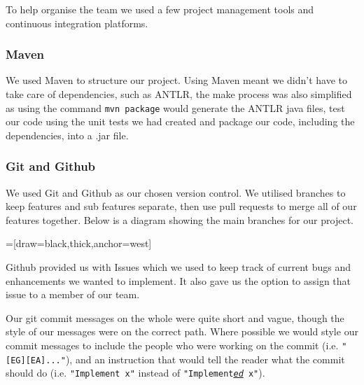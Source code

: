 \documentclass[11pt,a4paper]{article}
\begin{document}
To help organise the team we used a few project management tools and continuous integration platforms.

\subsubsection{Maven}
\label{subs:Maven}

We used Maven to structure our project. Using Maven meant we didn't have to take care of dependencies, such as ANTLR, the make process was also simplified as using the command \texttt{mvn package} would generate the ANTLR java files, test our code using the unit tests we had created and package our code, including the dependencies, into a .jar file.


\subsubsection{Git and Github}
\label{subs:Git and Github}

We used Git and Github as our chosen version control. We utilised branches to keep features and sub features separate, then use pull requests to merge all of our features together. Below is a diagram showing the main branches for our project.

=[draw=black,thick,anchor=west]

Github provided us with Issues which we used to keep track of current bugs and enhancements we wanted to implement. It also gave us the option to assign that issue to a member of our team.

Our git commit messages on the whole were quite short and vague, though the style of our messages were on the correct path. Where possible we would style our commit messages to include the people who were working on the commit (i.e. \texttt{"[EG][EA]..."}), and an instruction that would tell the reader what the commit should do (i.e. \texttt{"Implement x"} instead of \texttt{"Implement\underline{\textit{ed}} x"}).
\end{document}
